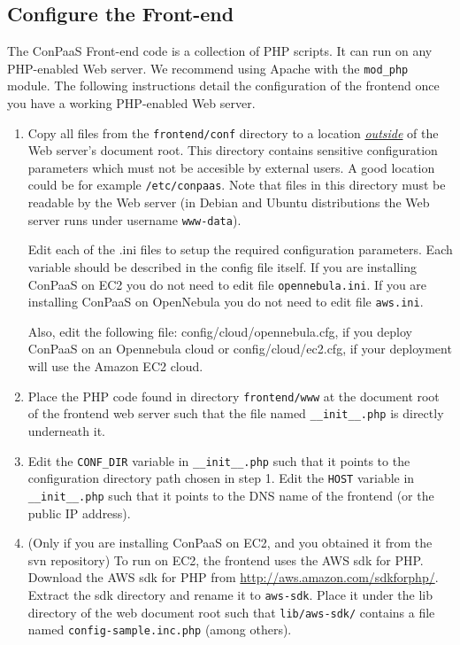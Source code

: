 \documentclass[10pt]{article}
\begin{document}
\subsection{Configure the Front-end}

The ConPaaS Front-end code is a collection of PHP scripts. It can run
on any PHP-enabled Web server. We recommend using Apache with the
\verb+mod_php+ module. The following instructions detail the
configuration of the frontend once you have a working PHP-enabled Web
server.

\begin{enumerate}
\item Copy all files from the \verb+frontend/conf+ directory to a
  location \uline{\emph{outside}} of the Web server's document root.
  This directory contains sensitive configuration parameters which
  must not be accesible by external users. A good location could be
  for example \verb+/etc/conpaas+. Note that files in this
  directory must be readable by the Web server (in Debian and Ubuntu
  distributions the Web server runs under username \verb+www-data+).

  Edit each of the .ini files to setup the required configuration
  parameters. Each variable should be described in the config file
  itself. If you are installing ConPaaS on EC2 you do not need to edit
  file \verb+opennebula.ini+. If you are installing ConPaaS on
  OpenNebula you do not need to edit file \verb+aws.ini+.

  Also, edit the following file: config/cloud/opennebula.cfg, if you
  deploy ConPaaS on an Opennebula cloud or config/cloud/ec2.cfg, if
  your deployment will use the Amazon EC2 cloud.

\item Place the PHP code found in directory \verb+frontend/www+ at the
  document root of the frontend web server such that the file named
  \verb+__init__.php+ is directly underneath it.

\item Edit the \verb+CONF_DIR+ variable in \verb+__init__.php+ such
  that it points to the configuration directory path chosen in step 1.
  Edit the \verb+HOST+ variable in \verb+__init__.php+ such that
  it points to the DNS name of the frontend (or the public IP address).

\item (Only if you are installing ConPaaS on EC2, and you obtained it 
  from the svn repository) To run on EC2, the frontend uses the AWS
  sdk for PHP. Download the AWS sdk for PHP from
  \url{http://aws.amazon.com/sdkforphp/}.  Extract the sdk directory
  and rename it to \verb+aws-sdk+. Place it under the lib directory of
  the web document root such that \verb+lib/aws-sdk/+ contains a
  file named \verb+config-sample.inc.php+ (among others).


\end{enumerate}
\end{document}
